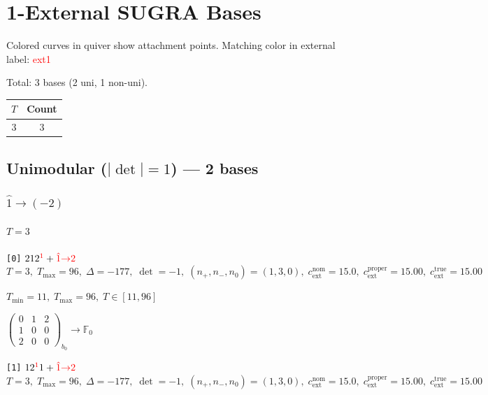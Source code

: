 \documentclass[10pt]{article}
\begin{document}
\section*{1-External SUGRA Bases}

Colored curves in quiver show attachment points. Matching color in external label: \textcolor{red}{ext1} 

Total: 3 bases (2 uni, 1 non-uni).

\begin{center}
\begin{tabular}{c|c}
\toprule
$T$ & Count \\
\midrule
3 & 3 \\
\bottomrule
\end{tabular}
\end{center}

\subsection*{Unimodular ($|\det|=1$) --- 2 bases}


\subsubsection*{$\hat{1}{\to}(-2)$}

\paragraph{$T=3$}

\texttt{[0]} $212^{\textcolor{red}{1}} + \textcolor{red}{\hat{1}{\to}2}$ \quad $T=3,\;T_{\max}=96,\;\Delta=-177,\;\det=-1,\;(n_+,n_-,n_0)=(1,3,0),\;c_\mathrm{ext}^{\mathrm{nom}}=15.0,\;c_\mathrm{ext}^{\mathrm{proper}}=15.00,\;c_\mathrm{ext}^{\mathrm{true}}=15.00$

\hspace{1em}$T_{\min}=11,\;T_{\max}=96,\;T\in[11,96]$

\hspace{2em}$\left(\begin{smallmatrix}0 & 1 & 2 \\ 1 & 0 & 0 \\ 2 & 0 & 0\end{smallmatrix}\right)_{\!b_0}\to \mathbb{F}_{0}$

\texttt{[1]} $12^{\textcolor{red}{1}}1 + \textcolor{red}{\hat{1}{\to}2}$ \quad $T=3,\;T_{\max}=96,\;\Delta=-177,\;\det=-1,\;(n_+,n_-,n_0)=(1,3,0),\;c_\mathrm{ext}^{\mathrm{nom}}=15.0,\;c_\mathrm{ext}^{\mathrm{proper}}=15.00,\;c_\mathrm{ext}^{\mathrm{true}}=15.00$
\end{document}
